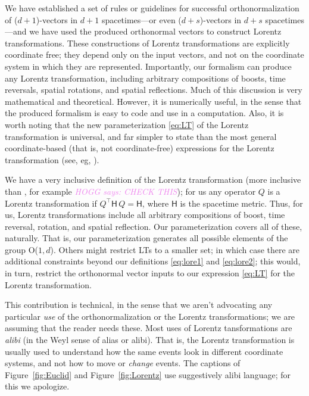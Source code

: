 \documentclass{article}
\newcommand{\metric}{\mathsf{H}}
\newcommand{\plus}{\!+\!} %
\newcommand{\figref}[1]{Figure~\ref{#1}}
\newcommand{\HOGG}[1]{\textcolor{violet}{\textsl{HOGG says: {#1}}}}
\begin{document}
We have established a set of rules or guidelines for successful orthonormalization of ($d\plus1$)-vectors in $d\plus1$ spacetimes---or even ($d\plus s$)-vectors in $d\plus s$ spacetimes---and we have used the produced orthonormal vectors to construct Lorentz transformations.
These constructions of Lorentz transformations are explicitly coordinate free; they depend only on the input vectors, and not on the coordinate system in which they are represented.
Importantly, our formalism can produce any Lorentz transformation, including arbitrary compositions of boosts, time reversals, spatial rotations, and spatial reflections.
Much of this discussion is very mathematical and theoretical.
However, it is numerically useful, in the sense that the produced formalism is easy to code and use in a computation.
Also, it is worth noting that the new parameterization \eqref{eq:LT} of the Lorentz transformation is universal, and far simpler to state than the most general coordinate-based (that is, not coordinate-free) expressions for the Lorentz transformation (see, eg, \cite{haber}).

We have a very inclusive definition of the Lorentz transformation (more inclusive than \cite{haber}, for example \HOGG{CHECK THIS}); for us any operator $Q$ is a Lorentz transformation if $Q^\top\metric\,Q=\metric$, where $\metric$ is the spacetime metric.
Thus, for us, Lorentz transformations include all arbitrary compositions of boost, time reversal, rotation, and spatial reflection.
Our parameterization covers all of these, naturally.
That is, our parameterization generates all possible elements of the group O($1,d$).
Others might restrict LTs to a smaller set; in which case there are additional constraints beyond our definitions \eqref{eq:lore1} and \eqref{eq:lore2}; this would, in turn, restrict the orthonormal vector inputs to our expression \eqref{eq:LT} for the Lorentz transformation.

This contribution is technical, in the sense that we aren't advocating any particular \emph{use} of the orthonormalization or the Lorentz transformations; we are assuming that the reader needs these.
Most uses of Lorentz tansformations are \emph{alibi} (in the Weyl \cite{weyl} sense of alias or alibi).
That is, the Lorentz transformation is usually used to understand how the same events look in different coordinate systems, and not how to move or \emph{change} events.
The captions of \figref{fig:Euclid} and \figref{fig:Lorentz} use suggestively alibi language; for this we apologize.
\end{document}
